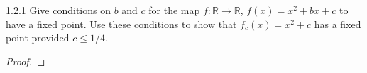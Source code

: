 \begin{problem}{1.2.1}
  Give conditions on $b$ and $c$ for the map
  $f: \mathbb{R} \to \mathbb{R}$, $f(x) = x^2 + bx + c$ to have a fixed point.
  Use these conditions to show that $f_c(x) = x^2 + c$ has a fixed point provided $c \leq 1/4$.
\end{problem}

\begin{proof}
\end{proof}
\newpage